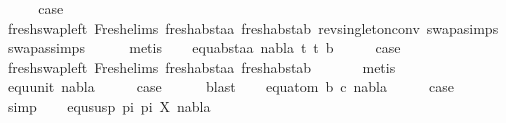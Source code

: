\begin{isabellebody}
\ \ \isamarkupfalse%
\ \isamarkupfalse%
\ {\isacharquery}{\kern0pt}case\ \isanewline
\ \ \ \ \isamarkupfalse%
\ fresh{\isacharunderscore}{\kern0pt}swap{\isacharunderscore}{\kern0pt}left\ Fresh{\isacharunderscore}{\kern0pt}elims{\isacharparenleft}{\kern0pt}{}{\isacharparenright}{\kern0pt}\ fresh{\isacharunderscore}{\kern0pt}abst{\isacharunderscore}{\kern0pt}aa\ fresh{\isacharunderscore}{\kern0pt}abst{\isacharunderscore}{\kern0pt}ab\ rev{\isacharunderscore}{\kern0pt}singleton{\isacharunderscore}{\kern0pt}conv\ swapa{\isachardot}{\kern0pt}simps\ swapas{\isachardot}{\kern0pt}simps{\isacharparenleft}{\kern0pt}{}{\isacharcomma}{\kern0pt}{}{\isacharparenright}{\kern0pt}\isanewline
\ \ \ \ \isamarkupfalse%
\ metis\isanewline
{}\isamarkupfalse%
\isanewline
\ \ \isamarkupfalse%
\ {\isacharparenleft}{\kern0pt}equ{\isacharunderscore}{\kern0pt}abst{\isacharunderscore}{\kern0pt}aa\ nabla\ t{}\ t{}\ b{\isacharparenright}{\kern0pt}\isanewline
\ \ \isamarkupfalse%
\ \isamarkupfalse%
\ {\isacharquery}{\kern0pt}case\ \isanewline
\ \ \ \ \isamarkupfalse%
\ fresh{\isacharunderscore}{\kern0pt}swap{\isacharunderscore}{\kern0pt}left\ Fresh{\isacharunderscore}{\kern0pt}elims{\isacharparenleft}{\kern0pt}{}{\isacharparenright}{\kern0pt}\ fresh{\isacharunderscore}{\kern0pt}abst{\isacharunderscore}{\kern0pt}aa\ fresh{\isacharunderscore}{\kern0pt}abst{\isacharunderscore}{\kern0pt}ab\ \isanewline
\ \ \ \ \isamarkupfalse%
\ metis\isanewline
{}\isamarkupfalse%
\isanewline
\ \ \isamarkupfalse%
\ {\isacharparenleft}{\kern0pt}equ{\isacharunderscore}{\kern0pt}unit\ nabla{\isacharparenright}{\kern0pt}\isanewline
\ \ \isamarkupfalse%
\ \isamarkupfalse%
\ {\isacharquery}{\kern0pt}case\isanewline
\ \ \ \ \isamarkupfalse%
\ blast\isanewline
{}\isamarkupfalse%
\isanewline
\ \ \isamarkupfalse%
\ {\isacharparenleft}{\kern0pt}equ{\isacharunderscore}{\kern0pt}atom\ b\ c\ nabla{\isacharparenright}{\kern0pt}\isanewline
\ \ \isamarkupfalse%
\ \isamarkupfalse%
\ {\isacharquery}{\kern0pt}case\ \isanewline
\ \ \ \ \isamarkupfalse%
\ simp\isanewline
{}\isamarkupfalse%
\isanewline
\ \ \isamarkupfalse%
\ {\isacharparenleft}{\kern0pt}equ{\isacharunderscore}{\kern0pt}susp\ pi{}\ pi{}\ X\ nabla{\isacharparenright}{\kern0pt}\isanewline

\end{isabellebody}
